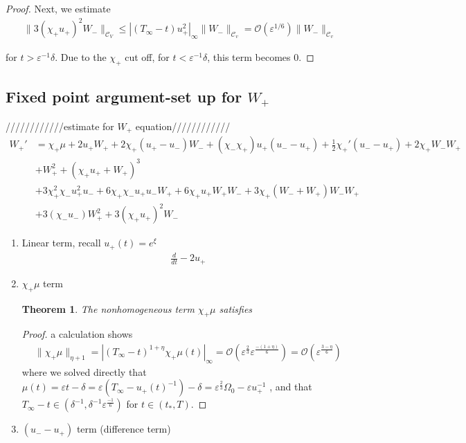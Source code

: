 \documentclass[letterpaper,11pt]{article}
\newcommand{\rmO}{\mathcal{O}}
\newcommand{\eps}{\varepsilon}
\numberwithin{equation}{section}
\theoremstyle{plain}
\newtheorem{theorem}{Theorem}[section]
\begin{document}
\begin{enumerate}
\begin{itemize}
\begin{enumerate}
\begin{proof}
Next, we estimate
\begin{align*}
\|3(\chi_+u_+)^2W_-\|_{\mathcal{C}_V} \le |(T_\infty - t)u_+^2|_\infty \|W_-\|_{\mathcal{C}_v} =\rmO(\eps^{1/6})\|W_-\|_{\mathcal{C}_v}
\end{align*}

for $t>\eps^{-1}\delta$. Due to the $\chi_+$ cut off, for $t<\eps^{-1}\delta$, this term becomes $0$.
\end{proof}
\end{enumerate}


\pagebreak
\subsection{Fixed point argument-set up for $W_+$}
////////////estimate for $W_+$ equation////////////
\begin{align*}
W_+'  &=  \chi_+\mu+2u_+W_+ + 2\chi_+(u_+ -u_-)W_-+ (\chi_-\chi_+) u_+(u_- -u_+)+\frac{1}{2}\chi_+'(u_- -u_+) +2\chi_+W_-W_+\\
&+W_+^2+ (\chi_+u_+ + W_+)^3 \\
&+ 3\chi_+^2\chi_-u_+^2u_- + 6\chi_+\chi_- u_+u_- W_+ +6 \chi_+u_+W_+W_- +3\chi_+(W_-+W_+)W_-W_+\\
&+3(\chi_-u_-)W_+^2 + 3(\chi_+u_+)^2W_-
\end{align*}

\begin{enumerate}
\item Linear term, recall $u_+(t) = e^\xi$
\begin{align*}
\frac{d}{dt} - 2u_+
\end{align*}

\item  $\chi_+\mu$ term
\begin{theorem}
The nonhomogeneous term $\chi_+ \mu$ satisfies
\end{theorem}

\begin{proof}a calculation shows
\begin{align*}
\|\chi_+ \mu \|_{\eta+1} = |(T_\infty -t)^{1+\eta}\chi_+\mu(t) |_\infty  = \rmO( \eps^{\frac{2}{3}} \eps^{\frac{-(1+\eta)}{6}} ) = \rmO(\eps^{\frac{3-\eta}{6}} )
\end{align*}
where we solved directly that $\mu(t) = \eps t -\delta = \eps(T_\infty - u_+(t)^{-1})-\delta= \eps^{\frac{2}{3}}\Omega_0 - \eps u_+^{-1}$ , and that $T_\infty - t \in (\delta^{-1},\delta^{-1}\eps^{\frac{-1}{6}})$ for $t \in (t_*,T)$.
\end{proof}
\item $(u_- - u_+)$ term (difference term)


\end{enumerate}
\end{itemize}
\end{enumerate}
\end{document}
